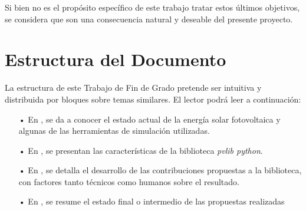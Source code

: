 Si bien no es el propósito específico de este trabajo tratar estos últimos objetivos, se considera que son una consecuencia natural y deseable del presente proyecto.


\section{Estructura del Documento} \label{sct:intro_estructura}

La estructura de este Trabajo de Fin de Grado pretende ser intuitiva y distribuida por bloques sobre temas similares. El lector podrá leer a continuación:

\begin{itemize}

    \item[•] En , se da a conocer el estado actual de la energía solar fotovoltaica y algunas de las herramientas de simulación utilizadas.

    \item[•] En , se presentan las características de la biblioteca \textit{pvlib python}.

    \item[•] En , se detalla el desarrollo de las contribuciones propuestas a la biblioteca, con factores tanto técnicos como humanos sobre el resultado.

    \item[•] En , se resume el estado final o intermedio de las propuestas realizadas

    
\end{itemize}



